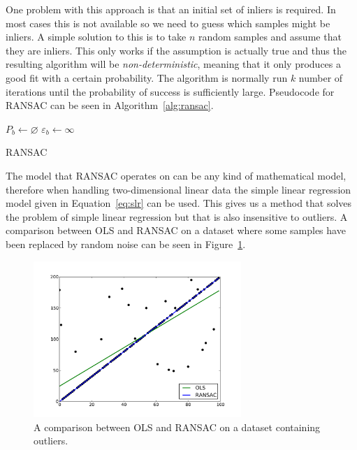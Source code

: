 \documentclass[a4paper]{report}
\begin{document}
One problem with this approach is that an initial set of inliers is required.
In most cases this is not available so we need to guess which samples might be
inliers. A simple solution to this is to take $n$ random samples and assume
that they are inliers. This only works if the assumption is actually true and
thus the resulting algorithm will be \emph{non-deterministic}, meaning that it
only produces a good fit with a certain probability. The algorithm is normally
run $k$ number of iterations until the probability of success is sufficiently
large. Pseudocode for RANSAC can be seen in Algorithm~\ref{alg:ransac}.

{
    \fontsize{10}{12}
    \selectfont
    \begin{algorithm}[t]
        \DontPrintSemicolon
        \BlankLine
        \BlankLine
        $P_b \gets \varnothing$\;
        $\varepsilon_b \gets \infty$\;
        \BlankLine
        \caption{RANSAC}
        \label{alg:ransac}
    \end{algorithm}
}

The model that RANSAC operates on can be any kind of mathematical model,
therefore when handling two-dimensional linear data the simple linear
regression model given in Equation~\ref{eq:slr} can be used. This gives us a
method that solves the problem of simple linear regression but that is also
insensitive to outliers. A comparison between OLS and RANSAC on a dataset where
some samples have been replaced by random noise can be seen in
Figure~\ref{fig:ransac}.

\begin{figure}[h]
    \centering
    \includegraphics[width=0.7\textwidth]{img/ransac}
    \captionsetup{width=0.8\textwidth}
    \caption{A comparison between OLS and RANSAC on a dataset containing
    outliers.}
    \label{fig:ransac}
\end{figure}
\end{document}
